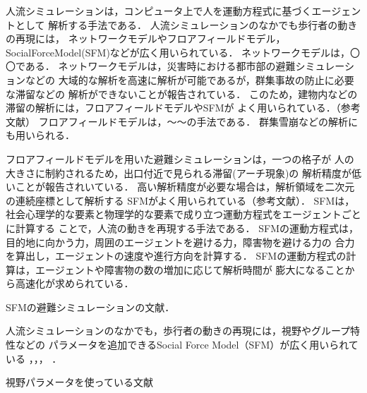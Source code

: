 人流シミュレーションは，コンピュータ上で人を運動方程式に基づくエージェントとして
解析する手法である．
人流シミュレーションのなかでも歩行者の動きの再現には，
ネットワークモデルやフロアフィールドモデル，SocialForceModel(SFM)などが広く用いられている\cite{helbing_sfm}\cite{sfm_ntt}．
ネットワークモデルは，〇〇である．
ネットワークモデルは，災害時における都市部の避難シミュレーションなどの
大域的な解析を高速に解析が可能であるが，群集事故の防止に必要な滞留などの
解析ができないことが報告されている．
このため，建物内などの滞留の解析には，フロアフィールドモデルやSFMが
よく用いられている．（参考文献）
フロアフィールドモデルは，～～の手法である\cite{floa_field1}\cite{floa_field2}．
群集雪崩などの解析にも用いられる\cite{floa_field3}．



フロアフィールドモデルを用いた避難シミュレーションは，一つの格子が
人の大きさに制約されるため，出口付近で見られる滞留(アーチ現象)の
解析精度が低いことが報告されいている．
高い解析精度が必要な場合は，解析領域を二次元の連続座標として解析する
SFMがよく用いられている（参考文献）．
SFMは，社会心理学的な要素と物理学的な要素で成り立つ運動方程式をエージェントごとに計算する
ことで，人流の動きを再現する手法である\cite{helbing_sfm}．
SFMの運動方程式は，目的地に向かう力，周囲のエージェントを避ける力，障害物を避ける力の
合力を算出し，エージェントの速度や進行方向を計算する．
SFMの運動方程式の計算は，エージェントや障害物の数の増加に応じて解析時間が
膨大になることから高速化が求められている．


SFMの避難シミュレーションの文献\cite{sfm_hinan1}\cite{sfm_hinan2}\cite{sfm_hinan3}．

人流シミュレーションのなかでも，歩行者の動きの再現には，視野やグループ特性などの
パラメータを追加できるSocial Force Model（SFM）が広く用いられている
\cite{helbing_sfm}，\cite{sfm_ntt}，\cite{sfm_para1}，\cite{intro_gunshu}
．

視野パラメータを使っている文献\cite{siya_ex2}\cite{siya_ex3}\cite{siya_ex4}\cite{siya_ex5}\cite{siya_ex6}\cite{siya_ex7}


